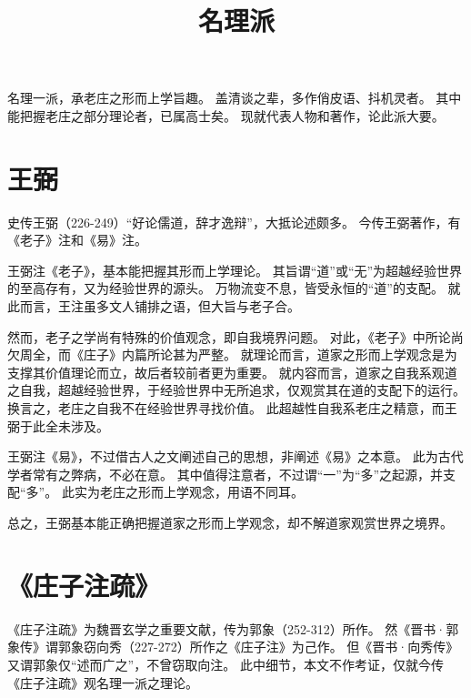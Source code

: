 \documentclass[11pt]{article}
\title{名理派}
\date{}
\begin{document}
  \maketitle

  \linenumbers

名理一派，承老庄之形而上学旨趣。
盖清谈之辈，多作俏皮语、抖机灵者。
其中能把握老庄之部分理论者，已属高士矣。
现就代表人物和著作，论此派大要。

\section{王弼}
史传王弼（226-249）“好论儒道，辞才逸辩”，大抵论述颇多。
今传王弼著作，有《老子》注和《易》注。

\par

王弼注《老子》，基本能把握其形而上学理论。
其旨谓“道”或“无”为超越经验世界的至高存有，又为经验世界的源头。
万物流变不息，皆受永恒的“道”的支配。
就此而言，王注虽多文人铺排之语，但大旨与老子合。

\par

然而，老子之学尚有特殊的价值观念，即自我境界问题。
对此，《老子》中所论尚欠周全，而《庄子》内篇所论甚为严整。
就理论而言，道家之形而上学观念是为支撑其价值理论而立，故后者较前者更为重要。
就内容而言，道家之自我系观道之自我，超越经验世界，于经验世界中无所追求，仅观赏其在道的支配下的运行。
换言之，老庄之自我不在经验世界寻找价值。
此超越性自我系老庄之精意，而王弼于此全未涉及。

\par

王弼注《易》，不过借古人之文阐述自己的思想，非阐述《易》之本意。
此为古代学者常有之弊病，不必在意。
其中值得注意者，不过谓“一”为“多”之起源，并支配“多”。
此实为老庄之形而上学观念，用语不同耳。

\par

总之，王弼基本能正确把握道家之形而上学观念，却不解道家观赏世界之境界。

\section{《庄子注疏》}
《庄子注疏》为魏晋玄学之重要文献，传为郭象（252-312）所作。
然《晋书·郭象传》谓郭象窃向秀（227-272）所作之《庄子注》为己作。
但《晋书·向秀传》又谓郭象仅“述而广之”，不曾窃取向注。
此中细节，本文不作考证，仅就今传《庄子注疏》观名理一派之理论。

\par
\end{document}
